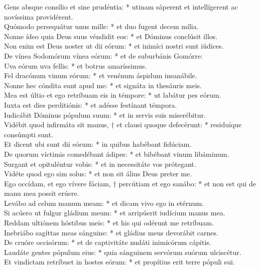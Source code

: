 {	%
	Gens absque consílio et sine prudéntia: * utinam sáperent et intellígerent ac novíssima providérent. \\
	Quómodo persequátur unus mille: * et duo fugent decem mília. \\
	Nonne ídeo quia Deus suus véndidit eos: * et Dóminus conclúsit illos. \\
	Non enim est Deus noster ut dii eórum: * et inimíci nostri sunt iúdices. \\
	De vínea Sodomórum vínea eórum: * et de suburbánis Gomórre:  \\
	Uva eórum uva fellis: * et botrus amaríssimus. \\
	Fel dracónum vinum eórum: * et venénum áspidum insanábile. \\
	Nonne hec cóndita sunt apud me: * et signáta in thesáuris meis. \\
	Mea est últio et ego retríbuam eis in témpore: * ut labátur pes eórum. \\
	Iuxta est dies perditiónis: * et adésse festínant témpora. \\
	Iudicábit Dóminus pópulum suum: * et in servis suis miserébitur. \\
	Vidébit quod infirmáta sit manus, † et clausi quoque defecérunt: * residuíque consúmpti sunt. \\
	Et dicent ubi sunt dii eórum: * in quibus habébant fidúciam. \\
	De quorum víctimis comedébant ádipes: * et bibébant vinum libáminum. \\
	Surgant et opituléntur vobis: * et in necessitáte vos prótegant. \\
	Vidéte quod ego sim solus: * et non sit álius Deus preter me. \\
	Ego occídam, et ego vívere fáciam, † percútiam et ego sanábo: * et non est qui de manu mea possit erúere. \\
	Levábo ad celum manum meam: * et dicam vivo ego in etérnum. \\
	Si acúero ut fulgur gládium meum: * et arripúerit iudícium manus mea. \\
	Reddam ultiónem hóstibus meis: * et his qui odérunt me retríbuam. \\
	Inebriábo sagíttas meas sánguine: * et gládius meus devorábit carnes. \\
	De cruóre occisórum: * et de captivitáte nudáti inimicórum cápitis. \\
	Laudáte gentes pópulum eius: * quia sánguinem servórum suórum ulciscétur. \\
	Et vindíctam retríbuet in hostes eórum: * et propítius erit terre pópuli sui.
}

